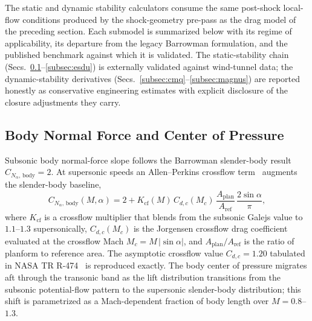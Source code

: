 
The static and dynamic stability calculators consume the same
post-shock local-flow conditions produced by the shock-geometry
pre-pass as the drag model of the preceding section. Each submodel is
summarized below with its regime of applicability, its departure from
the legacy Barrowman formulation, and the published benchmark against
which it is validated. The static-stability chain (Secs.~\ref{subsec:bodycp}--\ref{subsec:esdu})
is externally validated against wind-tunnel data; the dynamic-stability
derivatives (Secs.~\ref{subsec:cmq}--\ref{subsec:magnus}) are reported
honestly as conservative engineering estimates with explicit disclosure
of the closure adjustments they carry.

\subsection{Body Normal Force and Center of Pressure}
\label{subsec:bodycp}

Subsonic body normal-force slope follows the Barrowman slender-body
result $C_{N_\alpha,\,\mathrm{body}} = 2$. At supersonic speeds an
Allen--Perkins crossflow term~\cite{allenperkins1951} augments the
slender-body baseline,
%
\begin{equation}
C_{N_\alpha,\,\mathrm{body}}(M,\alpha) = 2
  + K_{\mathrm{cf}}(M)\,C_{d,c}(M_c)\,
    \frac{A_{\mathrm{plan}}}{A_{\mathrm{ref}}}\,
    \frac{2\sin\alpha}{\pi},
\label{eq:body_cna}
\end{equation}
%
where $K_{\mathrm{cf}}$ is a crossflow multiplier that blends from the
subsonic Galejs value to $1.1$--$1.3$ supersonically, $C_{d,c}(M_c)$ is
the Jorgensen crossflow drag coefficient~\cite{jorgensen1977} evaluated
at the crossflow Mach $M_c = M\,\lvert\sin\alpha\rvert$, and
$A_{\mathrm{plan}}/A_{\mathrm{ref}}$ is the ratio of planform to
reference area. The asymptotic crossflow value $C_{d,c} = 1.20$
tabulated in NASA TR R-474~\cite{jorgensen1977} is reproduced exactly.
The body center of pressure migrates aft through the transonic band as
the lift distribution transitions from the subsonic potential-flow
pattern to the supersonic slender-body distribution; this shift is
parametrized as a Mach-dependent fraction of body length over
$M = 0.8$--$1.3$.

